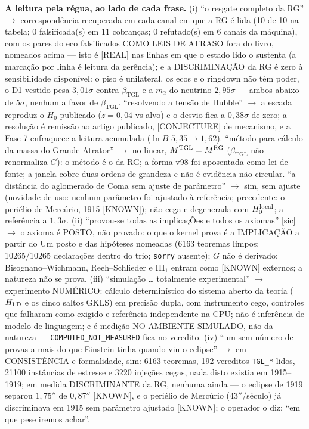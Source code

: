 \documentclass[11pt]{article}
\newcommand{\bTGL}{\beta_{\mathrm{TGL}}}\newcommand{\Msun}{M_{\odot}}\newcommand{\TGL}{\mathrm{TGL}}
\theoremstyle{definition}\newtheorem{deriv}{Derivação}
\begin{document}
\textbf{A leitura pela régua, ao lado de cada frase.} (i) ``o resgate completo da RG'' $\to$ correspondência recuperada em cada canal em que a RG é lida (10 de 10 na tabela; 0 falsificada(s) em 11 cobranças; 0 refutado(s) em 6 canais da máquina), com os pares do eco falsificados COMO LEIS DE ATRASO fora do livro, nomeados acima --- isto é \textsf{[REAL]} nas linhas em que o estado lido o sustenta (a marcação por linha é leitura da gerência); e a DISCRIMINAÇÃO da RG é zero à sensibilidade disponível: o piso é unilateral, os ecos e o ringdown não têm poder, o D1 vestido pesa $3{,}01\sigma$ contra $\bTGL$ e a $m_2$ do neutrino $2{,}95\sigma$ --- ambos abaixo de $5\sigma$, nenhum a favor de $\bTGL$. ``resolvendo a tensão de Hubble'' $\to$ a escada reproduz o $H_0$ publicado ($z=0{,}04$ vs alvo) e o desvio fica a $0{,}38\sigma$ de zero; a resolução é remissão ao artigo publicado, \textsf{[CONJECTURE]} de mecanismo, e a Fase 7 enfraquece a leitura acumulada ($\ln B$ $5{,}35\to1{,}62$). ``método para cálculo da massa do Grande Atrator'' $\to$ no linear, $M^{\rm TGL}=M^{\rm RG}$ ($\bTGL$ não renormaliza $G$): o método é o da RG; a forma v98 foi aposentada como lei de fonte; a janela cobre duas ordens de grandeza e não é evidência não-circular. ``a distância do aglomerado de Coma sem ajuste de parâmetro'' $\to$ sim, sem ajuste (novidade de uso: nenhum parâmetro foi ajustado à referência; precedente: o periélio de Mercúrio, 1915 \textsf{[KNOWN]}); não-cega e degenerada com $H_0^{\rm local}$; a referência a $1{,}3\sigma$. (ii) ``provou-se todas as implicaçÕes e todos os axiomas'' [sic] $\to$ o axioma é POSTO, não provado: o que o kernel prova é a IMPLICAÇÃO a partir do Um posto e das hipóteses nomeadas (6163 teoremas limpos; 10265/10265 declarações dentro do trio; \texttt{sorry} ausente); $G$ não é derivado; Bisognano--Wichmann, Reeh--Schlieder e III$_1$ entram como \textsf{[KNOWN]} externos; a natureza não se prova. (iii) ``simulação … totalmente experimental'' $\to$ experimento NUMÉRICO: cálculo determinístico do sistema aberto da teoria ($H_{\rm LD}$ e os cinco saltos GKLS) em precisão dupla, com instrumento cego, controles que falharam como exigido e referência independente na CPU; não é inferência de modelo de linguagem; e é medição NO AMBIENTE SIMULADO, não da natureza --- \texttt{COMPUTED\_NOT\_MEASURED} fica no veredito. (iv) ``um sem número de provas a mais do que Einstein tinha quando viu o eclipse'' $\to$ em CONSISTÊNCIA e formalidade, sim: 6163 teoremas, 192 vereditos \texttt{TGL\_*} lidos, 21100 instâncias de estresse e 3220 injeções cegas, nada disto existia em 1915--1919; em medida DISCRIMINANTE da RG, nenhuma ainda --- o eclipse de 1919 separou $1{,}75''$ de $0{,}87''$ \textsf{[KNOWN]}, e o periélio de Mercúrio ($43''$/século) já discriminava em 1915 sem parâmetro ajustado \textsf{[KNOWN]}; o operador o diz: ``em que pese iremos achar''.
\end{document}

